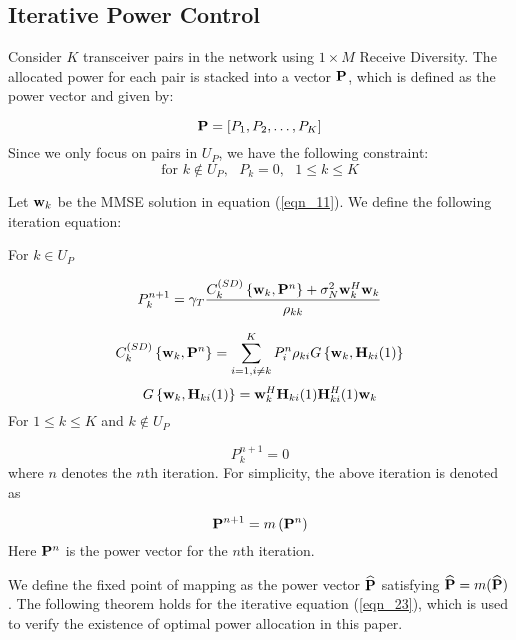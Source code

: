 \documentclass[draftcls,onecolumn,peerview,12pt]{IEEEtran}
\begin{document}
\subsection{Iterative Power Control}
Consider $K$ transceiver pairs in the network using $1 \times M$
Receive Diversity. The allocated power for each pair is stacked into
a vector $\rm{\bf P}$, which is defined as the power vector and
given by:

\begin{equation}
{\rm{\bf P}} = \left[ P_1,P_2,\ldots,P_K\right]
\end{equation}
Since we only focus on pairs in $U_P$, we have the following
constraint:
\begin{equation}
\label{Pk0} \mbox{for }k\notin U_P ,\mbox{ }P_k =0,\mbox{ }1\le k\le
K
\end{equation}

Let ${\rm{\bf w}}_k$ be the MMSE solution in equation
(\ref{eqn_11}). We define the following iteration equation:

For $k \in U_P$

\begin{equation}
P_{k}^{n+1}=\gamma_T \frac{C_k^{(SD)}\left\{{\rm{\bf w}}_k,{\rm{\bf
P}}^{n}\right\}+\sigma_N^{2}{\rm{\bf w}}_k^{H}{\rm{\bf
w}}_k}{\rho_{kk}}
\end{equation}

\begin{equation}
C_k^{(SD)}\left\{{\rm{\bf w}}_k, {\rm{\bf
P}}^{n}\right\}=\sum\limits_{i=1,i\neq
k}^{K}P_i^{n}\rho_{ki}G\left\{{\rm{\bf w}}_k, {\rm{\bf
H}}_{ki}(1)\right\}
\end{equation}
\begin{equation}
G\left\{ {{\rm {\bf w}}_k ,{\rm {\bf H}}_{ki} (1)} \right\}={\rm
{\bf w}}_k^H {\rm {\bf H}}_{ki} (1){\rm {\bf H}}_{ki}^H (1){\rm {\bf
w}}_k
\end{equation}
For $1\leq k \leq K$ and $k \notin U_P$

\begin{equation}
P_k^{n+1}=0
\end{equation}
where $n$ denotes the $n$th iteration. For simplicity, the above
iteration is denoted as

\begin{equation}
\label{eqn_23} {\rm{\bf P}}^{n+1}=m\left({\rm{\bf P}}^{n}\right)
\end{equation}
Here ${\rm{\bf P}}^{n}$ is the power vector for the $n$th iteration.

We define the fixed point of mapping as the power vector
$\widehat{\rm{\bf P}}$ satisfying $\widehat{{\rm{\bf
P}}}=m(\widehat{{\rm{\bf P}}})$. The following theorem holds for the
iterative equation (\ref{eqn_23}), which is used to verify the
existence of optimal power allocation in this paper.
\end{document}
